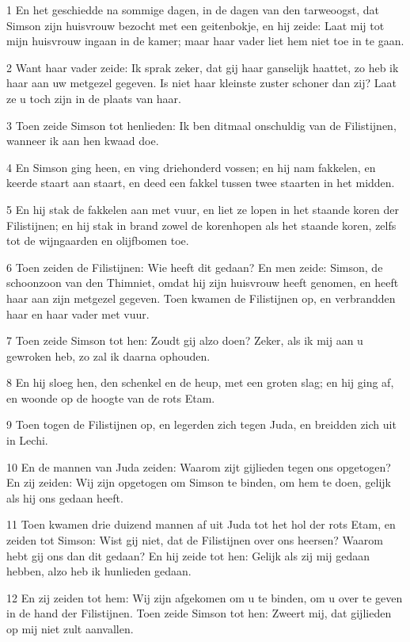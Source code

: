 \par 1 En het geschiedde na sommige dagen, in de dagen van den tarweoogst, dat Simson zijn huisvrouw bezocht met een geitenbokje, en hij zeide: Laat mij tot mijn huisvrouw ingaan in de kamer; maar haar vader liet hem niet toe in te gaan.
\par 2 Want haar vader zeide: Ik sprak zeker, dat gij haar ganselijk haattet, zo heb ik haar aan uw metgezel gegeven. Is niet haar kleinste zuster schoner dan zij? Laat ze u toch zijn in de plaats van haar.
\par 3 Toen zeide Simson tot henlieden: Ik ben ditmaal onschuldig van de Filistijnen, wanneer ik aan hen kwaad doe.
\par 4 En Simson ging heen, en ving driehonderd vossen; en hij nam fakkelen, en keerde staart aan staart, en deed een fakkel tussen twee staarten in het midden.
\par 5 En hij stak de fakkelen aan met vuur, en liet ze lopen in het staande koren der Filistijnen; en hij stak in brand zowel de korenhopen als het staande koren, zelfs tot de wijngaarden en olijfbomen toe.
\par 6 Toen zeiden de Filistijnen: Wie heeft dit gedaan? En men zeide: Simson, de schoonzoon van den Thimniet, omdat hij zijn huisvrouw heeft genomen, en heeft haar aan zijn metgezel gegeven. Toen kwamen de Filistijnen op, en verbrandden haar en haar vader met vuur.
\par 7 Toen zeide Simson tot hen: Zoudt gij alzo doen? Zeker, als ik mij aan u gewroken heb, zo zal ik daarna ophouden.
\par 8 En hij sloeg hen, den schenkel en de heup, met een groten slag; en hij ging af, en woonde op de hoogte van de rots Etam.
\par 9 Toen togen de Filistijnen op, en legerden zich tegen Juda, en breidden zich uit in Lechi.
\par 10 En de mannen van Juda zeiden: Waarom zijt gijlieden tegen ons opgetogen? En zij zeiden: Wij zijn opgetogen om Simson te binden, om hem te doen, gelijk als hij ons gedaan heeft.
\par 11 Toen kwamen drie duizend mannen af uit Juda tot het hol der rots Etam, en zeiden tot Simson: Wist gij niet, dat de Filistijnen over ons heersen? Waarom hebt gij ons dan dit gedaan? En hij zeide tot hen: Gelijk als zij mij gedaan hebben, alzo heb ik hunlieden gedaan.
\par 12 En zij zeiden tot hem: Wij zijn afgekomen om u te binden, om u over te geven in de hand der Filistijnen. Toen zeide Simson tot hen: Zweert mij, dat gijlieden op mij niet zult aanvallen.
